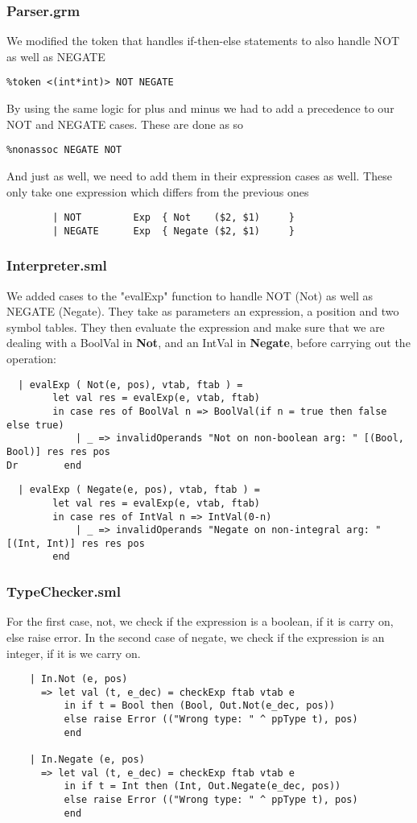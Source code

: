 \documentclass[12pt]{article}
\begin{document}
\subsubsection{Parser.grm}
We modified the token that handles if-then-else statements to also handle NOT as well as NEGATE
\begin{verbatim}
%token <(int*int)> NOT NEGATE
\end{verbatim}

By using the same logic for plus and minus we had to add a precedence to our NOT and NEGATE cases. These are done as so
\begin{verbatim}
%nonassoc NEGATE NOT
\end{verbatim}
And just as well, we need to add them in their expression cases as well. These only take one expression which differs from the previous ones
\begin{verbatim}
        | NOT         Exp  { Not    ($2, $1)     }
        | NEGATE      Exp  { Negate ($2, $1)     }
\end{verbatim}


\subsubsection{Interpreter.sml}
We added cases to the "evalExp" function to handle NOT (Not) as well as NEGATE (Negate). They take as parameters an expression, a position and two symbol tables. They then evaluate the expression and make sure that we are dealing with a BoolVal in \textbf{Not}, and an IntVal in \textbf{Negate}, before carrying out the operation:

\begin{verbatim}
  | evalExp ( Not(e, pos), vtab, ftab ) =
        let val res = evalExp(e, vtab, ftab)
        in case res of BoolVal n => BoolVal(if n = true then false else true)
            | _ => invalidOperands "Not on non-boolean arg: " [(Bool, Bool)] res res pos
Dr        end
\end{verbatim}
\begin{verbatim}
  | evalExp ( Negate(e, pos), vtab, ftab ) =
        let val res = evalExp(e, vtab, ftab)
        in case res of IntVal n => IntVal(0-n)
            | _ => invalidOperands "Negate on non-integral arg: " [(Int, Int)] res res pos
        end
\end{verbatim}
\subsubsection{TypeChecker.sml}
For the first case, not, we check if the expression is a boolean, if it is carry on, else raise error. In the second case of negate, we check if the expression is an integer, if it is we carry on.
\begin{verbatim}
    | In.Not (e, pos)
      => let val (t, e_dec) = checkExp ftab vtab e
          in if t = Bool then (Bool, Out.Not(e_dec, pos))
          else raise Error (("Wrong type: " ^ ppType t), pos) 
          end

    | In.Negate (e, pos)
      => let val (t, e_dec) = checkExp ftab vtab e
          in if t = Int then (Int, Out.Negate(e_dec, pos))
          else raise Error (("Wrong type: " ^ ppType t), pos) 
          end
\end{verbatim}
\end{document}

